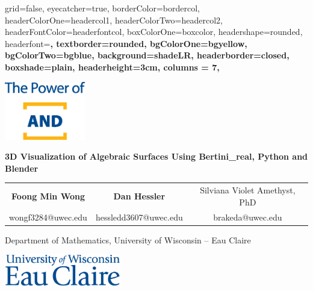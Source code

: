 \documentclass[paperwidth=46in, paperheight = 33.11in]{baposter}%
\begin{document}

\begin{poster}{
grid=false,
eyecatcher=true,
borderColor=bordercol,
headerColorOne=headercol1,
headerColorTwo=headercol2,
headerFontColor=headerfontcol,
boxColorOne=boxcolor, %
headershape=rounded, %
headerfont=\Large\sffamily\bfseries,%
textborder=rounded, %
bgColorOne=bgyellow,  %
bgColorTwo=bgblue, %
background=shadeLR,
headerborder=closed,
boxshade=plain,
headerheight=3cm,
columns = 7,
}
{
    \includegraphics[height=1.0in]{Power-of-AND_stckd_blu_CMYK.eps}

}
{\sffamily\bfseries \fontsize{18pt}{12pt}\selectfont \vspace{1.5mm}
3D Visualization of Algebraic Surfaces Using Bertini\_real, Python and Blender
}
{
\begin{minipage}{1\linewidth} \bf\sf
\centering
\footnotesize{
\begin{tabularx}{0.99\linewidth}{C  C  C} 
\Large{\sffamily\bfseries Foong Min Wong}			&	\Large{\sffamily\bfseries Dan Hessler}      & \large{Silviana Violet Amethyst, PhD}\\
wongf3284@uwec.edu & hessledd3607@uwec.edu & brakeda@uwec.edu \\
\end{tabularx}}
\end{minipage}
\centering
\newline
\newline
\large{\sffamily Department of Mathematics, University of Wisconsin -- Eau Claire}
}
{
\includegraphics[width=2in]{UWEC-stacked-wordmark-Blue_cmyk.eps} 
}


\end{poster}
\end{document}
